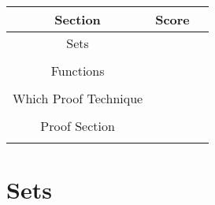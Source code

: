 \documentclass[11pt,answers]{exam}
\begin{document}
\begin{center}


\begin{tabular}{|c|c|c|}
\hline
Section &Score\\
\hline
Sets &\\
&\\
\hline
Functions &\\
&\\
\hline
Which Proof Technique &\\
&\\
\hline
Proof Section &\\
&\\
\hline
\end{tabular}
\end{center}


\pagebreak


\section{Sets}
\end{document}
